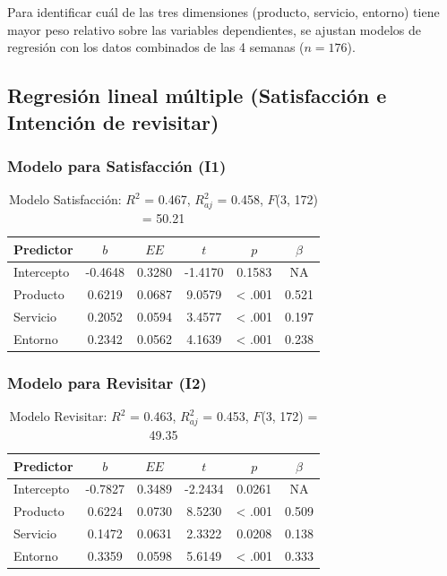 \documentclass[
  spanish,
]{article}
\begin{document}
Para identificar cuál de las tres dimensiones (producto, servicio,
entorno) tiene mayor peso relativo sobre las variables dependientes, se
ajustan modelos de regresión con los datos combinados de las 4 semanas
(\(n = 176\)).

\subsection{Regresión lineal múltiple (Satisfacción e Intención de
revisitar)}\label{regresiuxf3n-lineal-muxfaltiple-satisfacciuxf3n-e-intenciuxf3n-de-revisitar}

\subsubsection{Modelo para Satisfacción
(I1)}\label{modelo-para-satisfacciuxf3n-i1}

\begin{table}[!h]
\centering
\caption{\label{tab:reg-satisf-print}Modelo Satisfacción: $R^2$ = 0.467, $R^2_{aj}$ = 0.458, $F$(3, 172) = 50.21}
\centering
\begin{tabular}[t]{lccccc}
\toprule
Predictor & $b$ & $EE$ & $t$ & $p$ & $\beta$\\
\midrule
Intercepto & -0.4648 & 0.3280 & -1.4170 & 0.1583 & NA\\
Producto & 0.6219 & 0.0687 & 9.0579 & < .001 & 0.521\\
Servicio & 0.2052 & 0.0594 & 3.4577 & < .001 & 0.197\\
Entorno & 0.2342 & 0.0562 & 4.1639 & < .001 & 0.238\\
\bottomrule
\end{tabular}
\end{table}

\subsubsection{Modelo para Revisitar
(I2)}\label{modelo-para-revisitar-i2}

\begin{table}[!h]
\centering
\caption{\label{tab:reg-revis-print}Modelo Revisitar: $R^2$ = 0.463, $R^2_{aj}$ = 0.453, $F$(3, 172) = 49.35}
\centering
\begin{tabular}[t]{lccccc}
\toprule
Predictor & $b$ & $EE$ & $t$ & $p$ & $\beta$\\
\midrule
Intercepto & -0.7827 & 0.3489 & -2.2434 & 0.0261 & NA\\
Producto & 0.6224 & 0.0730 & 8.5230 & < .001 & 0.509\\
Servicio & 0.1472 & 0.0631 & 2.3322 & 0.0208 & 0.138\\
Entorno & 0.3359 & 0.0598 & 5.6149 & < .001 & 0.333\\
\bottomrule
\end{tabular}
\end{table}
\end{document}
